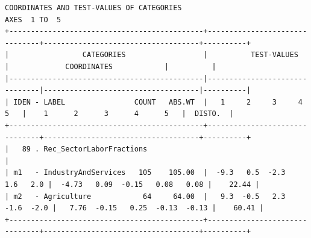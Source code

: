 \documentclass[a4paper,10pt,twocolumn]{article}
\begin{document}
\begin{landscape}
\begin{verbatim}
COORDINATES AND TEST-VALUES OF CATEGORIES
AXES  1 TO  5
+---------------------------------------------+-------------------------------+------------------------------------+----------+
|                 CATEGORIES                  |          TEST-VALUES          |             COORDINATES            |          |
|---------------------------------------------|-------------------------------|------------------------------------|----------|
| IDEN - LABEL                COUNT   ABS.WT  |   1     2     3     4     5   |    1      2      3      4      5   |  DISTO.  |
+---------------------------------------------+-------------------------------+------------------------------------+----------+
|   89 . Rec_SectorLaborFractions                                                                                             |
| m1   - IndustryAndServices   105    105.00  |  -9.3   0.5  -2.3   1.6   2.0 |  -4.73   0.09  -0.15   0.08   0.08 |    22.44 |
| m2   - Agriculture            64     64.00  |   9.3  -0.5   2.3  -1.6  -2.0 |   7.76  -0.15   0.25  -0.13  -0.13 |    60.41 |
+---------------------------------------------+-------------------------------+------------------------------------+----------+


\end{verbatim}
\end{landscape}
\end{document}
